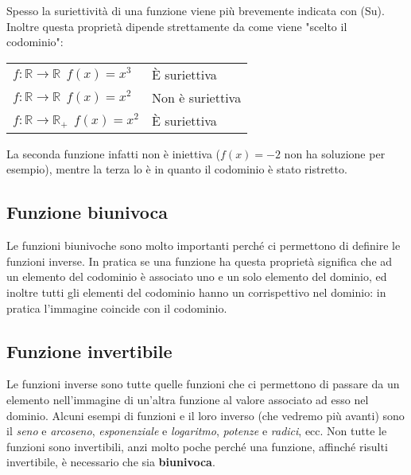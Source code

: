 Spesso la suriettività di una funzione viene più brevemente indicata con (Su). Inoltre questa proprietà dipende strettamente da come viene "scelto il codominio":

\begin{table}[H]
\centering
\begin{tabular}{ll}
$f: \mathbb{R} \to \mathbb{R}\;\, f(x) = x^3$          & È suriettiva      \\
$f: \mathbb{R} \to \mathbb{R}\;\, f(x) = x^2$        & Non è suriettiva  \\
$f: \mathbb{R} \to \mathbb{R}_{+}\;\, f(x) = x^2$ & È suriettiva     
\end{tabular}
\end{table}

La seconda funzione infatti non è iniettiva ($f(x) = -2$ non ha soluzione per esempio), mentre la terza lo è in quanto il codominio è stato ristretto.

\subsection{Funzione biunivoca}

Le funzioni biunivoche sono molto importanti perché ci permettono di definire le funzioni inverse. In pratica se una funzione ha questa proprietà significa che ad un elemento del codominio è associato uno e un solo elemento del dominio, ed inoltre tutti gli elementi del codominio hanno un corrispettivo nel dominio: in pratica l'immagine coincide con il codominio.

\subsection{Funzione invertibile}
Le funzioni inverse sono tutte quelle funzioni che ci permettono di passare da un elemento nell'immagine di un'altra funzione al valore associato ad esso nel dominio. Alcuni esempi di funzioni e il loro inverso (che vedremo più avanti) sono il \textit{seno} e \textit{arcoseno}, \textit{esponenziale} e \textit{logaritmo}, \textit{potenze} e \textit{radici}, ecc. Non tutte le funzioni sono invertibili, anzi molto poche perché una funzione, affinché risulti invertibile, è necessario che sia \textbf{biunivoca}.


